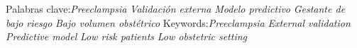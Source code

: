\documentclass{article}
\begin{document}
Palabras clave:\textit{Preeclampsia}
\textit{Validación externa}
\textit{Modelo predictivo}
\textit{Gestante de bajo riesgo}
\textit{Bajo volumen obstétrico}
Keywords:\textit{Preeclampsia}
\textit{External validation}
\textit{Predictive model}
\textit{Low risk patients}
\textit{Low obstetric setting}
\section{}

\section{}

\section{}

\section{}

\section{}
\end{document}
